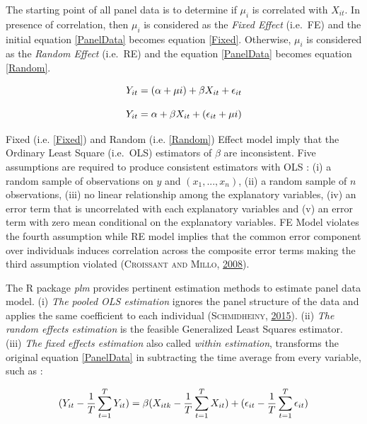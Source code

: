 \documentclass[12pt,]{article}
\begin{document}
The starting point of all panel data is to determine if \(\mu_{i}\) is
correlated with \(X_{it}\). In presence of correlation, then \(\mu_{i}\)
is considered as the \emph{Fixed Effect} (i.e.~FE) and the initial
equation \ref{PanelData} becomes equation \ref{Fixed}. Otherwise,
\(\mu_{i}\) is considered as the \emph{Random Effect} (i.e.~RE) and the
equation \ref{PanelData} becomes equation \ref{Random}.

\begin{equation}
\centering
Y_{it} = (\alpha + \mu{i}) + \beta X_{it} + \epsilon_{it} 
\label{Fixed}
\end{equation}

\begin{equation}
\centering
Y_{it} = \alpha + \beta X_{it} + (\epsilon_{it} + \mu{i})
\label{Random}
\end{equation}

Fixed (i.e. \autoref{Fixed}) and Random (i.e. \autoref{Random}) Effect
model imply that the Ordinary Least Square (i.e.~OLS) estimators of
\(\beta\) are inconsistent. Five assumptions are required to produce
consistent estimators with OLS : (i) a random sample of observations on
\(y\) and \((x_{1},..., x_{n})\), (ii) a random sample of \(n\)
observations, (iii) no linear relationship among the explanatory
variables, (iv) an error term that is uncorrelated with each explanatory
variables and (v) an error term with zero mean conditional on the
explanatory variables. FE Model violates the fourth assumption while RE
model implies that the common error component over individuals induces
correlation across the composite error terms making the third assumption
violated (\textsc{Croissant and Millo},
\protect\hyperlink{ref-Croissant2008}{2008}).

The R package \emph{plm} provides pertinent estimation methods to
estimate panel data model. (i) \emph{The pooled OLS estimation} ignores
the panel structure of the data and applies the same coefficient to each
individual (\textsc{Schmidheiny},
\protect\hyperlink{ref-Schmidheiny2015}{2015}). (ii) \emph{The random
effects estimation} is the feasible Generalized Least Squares estimator.
(iii) \emph{The fixed effects estimation} also called \emph{within
estimation}, transforms the original equation \ref{PanelData} in
subtracting the time average from every variable, such as :

\begin{equation}
\centering
( Y_{it} - \frac{1}{T} \displaystyle\sum_{t=1}^{T} Y_{it} ) = \beta (X_{itk} - \frac{1}{T} \displaystyle\sum_{t=1}^{T} X_{it} ) + ( \epsilon_{it} - \frac{1}{T} \displaystyle\sum_{t=1}^{T} \epsilon_{it} )
\label{FixedEffectsEstimation}
\end{equation}
\end{document}
